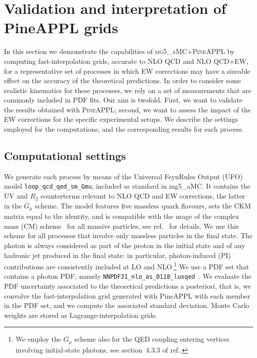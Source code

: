 \section{Validation and interpretation of PineAPPL grids}
\label{sec:results}

In this section we demonstrate the capabilities of \textsc{mg5\_aMC}+\textsc{PineAPPL} by
computing fast-interpolation grids, accurate to NLO QCD and NLO QCD+EW,
for a representative set of processes in which EW corrections may have a
sizeable effect on the accuracy of the theoretical predictions.
In order to consider some realistic kinematics for these
processes, we rely on a set of measurements that are commonly included in PDF
fits. Our aim is twofold. First, we want to validate the results
obtained with \textsc{PineAPPL}; second, we want to assess the
impact of the EW corrections for the specific experimental setups. We describe
the settings employed for the computations, and the corresponding results for
each process.

\subsection{Computational settings}
\label{subsec:computational_settings}

We generate each process by means of the Universal FeynRules Output
(UFO)~\cite{Degrande:2011ua} model {\tt loop\_qcd\_qed\_sm\_Gmu},
included as standard in {\sc mg5\_aMC}. It contains the UV and $R_2$
counterterms relevant to NLO QCD and EW corrections, the latter in the
$\overline{G}_\mu$ scheme. The model features five massless quark flavours,
sets the CKM matrix equal to the identity, and is compatible with the usage of
the complex mass (CM) scheme~\cite{Denner:1999gp,Denner:2005fg} for all massive particles, see
ref.~\cite{Frederix:2018nkq} for details. We use this scheme
for all processes that involve only massless particles in the final state.
The photon is always considered as part of the proton in the initial state and
of any hadronic jet produced in the final state: 
 in particular, photon-induced (PI) contributions are consistently included at LO and NLO.\footnote{We employ the $\overline{G}_\mu$ scheme also for the QED coupling entering vertices involving initial-state photons, see section~4.3.3 of ref.\cite{Denner:2019vbn}.}
We use a PDF set that contains a photon PDF, namely
{\tt NNPDF31\_nlo\_as\_0118\_luxqed}~\cite{Bertone:2017bme}. We evaluate the PDF
uncertainty associated to the theoretical predictions a posteriori, that is,
we convolve the fast-interpolation grid generated with {\sc PineAPPL} with
each member in the PDF set, and we compute the associated standard deviation. Monte Carlo
weights are stored as Lagrange-interpolation grids.

